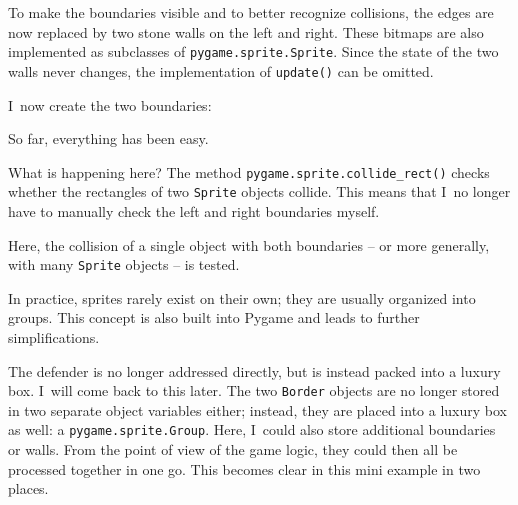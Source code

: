 To make the boundaries visible and to better recognize collisions, the edges are now replaced by two stone walls on the left and right. These bitmaps are also implemented as subclasses of \texttt{pygame.sprite.Sprite}. Since the state of the two walls never changes, the implementation of \texttt{update()} can be omitted.


I~now create the two boundaries:


So far, everything has been easy.


What is happening here? The method \texttt{pygame.sprite.collide\_rect()} checks whether the rectangles of two \texttt{Sprite} objects collide. This means that I~no longer have to manually check the left and right boundaries myself.

Here, the collision of a single object with both boundaries -- or more generally, with many \texttt{Sprite} objects -- is tested. 

\begin{hintbox}[Spritegroups]
	In practice, sprites rarely exist on their own; they are usually organized into groups. This concept is also built into Pygame and leads to further simplifications.
\end{hintbox}


The defender is no longer addressed directly, but is instead packed into a luxury box. I~will come back to this later. The two \texttt{Border} objects are no longer stored in two separate object variables either; instead, they are placed into a luxury box as well: a \texttt{pygame.sprite.Group}. Here, I~could also store additional boundaries or walls. From the point of view of the game logic, they could then all be processed together in one go. This becomes clear in this mini example in two places.


